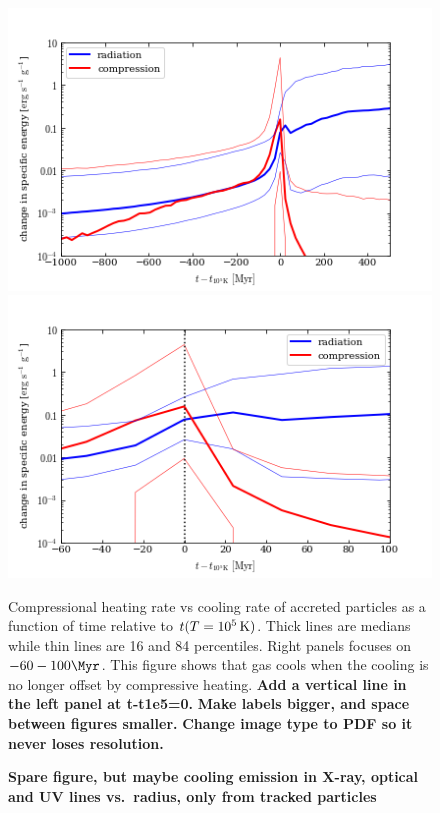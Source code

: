 \documentclass[fleqn,usenatbib]{mnras}
\begin{document}
\begin{figure}
\includegraphics[width=\columnwidth]{rad_vs_compress.png}
\includegraphics[width=\columnwidth]{rad_vs_compress_zoom.png}
\caption{
Compressional heating rate vs cooling rate of accreted particles as a function of time relative to $t(T=10^5\,{\rm K})$.
Thick lines are medians while thin lines are 16 and 84 percentiles.
Right panels focuses on $-60 - 100\Myr$.
This figure shows that gas cools when the cooling is no longer offset by compressive heating.
\textbf{
Add a vertical line in the left panel at t-t1e5=0.
}
\textbf{
Make labels bigger, and space between figures smaller.
}
\textbf{
Change image type to PDF so it never loses resolution.
}
}
\end{figure}

\begin{figure}
    \centering
    \caption{
    \textbf{Spare figure, but maybe
    cooling emission in X-ray, optical and UV lines vs.\ radius, only from tracked particles
    }
    }
    \label{f:emission}
\end{figure}
\end{document}

